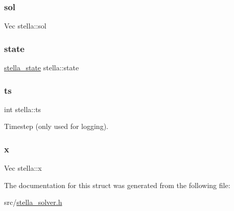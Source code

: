 \mbox{\label{structstella_a58a97ffe5282902bff30e2ff96b9dddd}} 
\subsubsection{\texorpdfstring{sol}{sol}}
{\footnotesize\ttfamily Vec stella\+::sol}

\mbox{\label{structstella_aac56c924df3628157325df5abaece198}} 
\subsubsection{\texorpdfstring{state}{state}}
{\footnotesize\ttfamily \mbox{\hyperlink{structstella__state}{stella\+\_\+state}} stella\+::state}

\mbox{\label{structstella_acc8da3f8945e90877d65acb6d89e3e09}} 
\subsubsection{\texorpdfstring{ts}{ts}}
{\footnotesize\ttfamily int stella\+::ts}



Timestep (only used for logging). 

\mbox{\label{structstella_a750f469d7d2f9ffaec59387b0f96f268}} 
\subsubsection{\texorpdfstring{x}{x}}
{\footnotesize\ttfamily Vec stella\+::x}



The documentation for this struct was generated from the following file\+:\begin{DoxyCompactItemize}
\item 
src/\mbox{\hyperlink{stella__solver_8h}{stella\+\_\+solver.\+h}}\end{DoxyCompactItemize}
